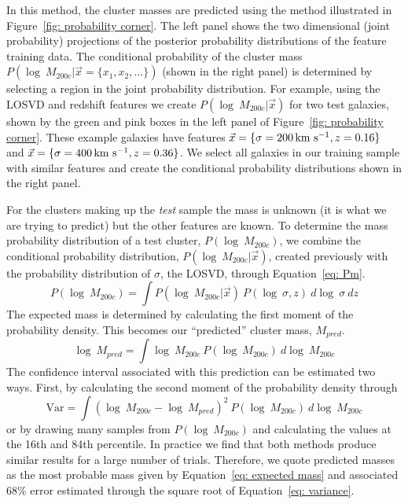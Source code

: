\documentclass[fleqn,usenatbib]{mnras}
\begin{document}
In this method, the cluster masses are predicted using the method illustrated in Figure~\ref{fig: probability corner}. The left panel shows the two dimensional (joint probability) projections of the posterior probability distributions of the feature training data. The conditional probability of the cluster mass $P(\log\ M_{200c}|\vec{x}= \{ x_1,x_2,...\})$ (shown in the right panel) is determined by selecting a region in the joint probability distribution. For example, using the LOSVD and redshift features we create $P(\log\ M_{200c}|\vec{x})$ for two test galaxies, shown by the green and pink boxes in the left panel of Figure~\ref{fig: probability corner}. These example galaxies have features $\vec{x} = \{\sigma=200\, \hbox{km~s$^{-1}$},z=0.16\}$ and $\vec{x} = \{\sigma=400\, \hbox{km~s$^{-1}$},z=0.36\}$. We select all galaxies in our training sample with similar features and create the conditional probability distributions shown in the right panel.

For the clusters making up the \emph{test} sample the mass is unknown (it is what we are trying to predict) but the other features are known. To determine the mass probability distribution of a test cluster, $P(\log\ M_{200c})$, we combine the conditional probability distribution, $P(\log\ M_{200c}|\vec{x})$, created previously with the probability distribution of $\sigma$, the LOSVD, through Equation~\ref{eq: Pm}.
\begin{equation}\label{eq: Pm}
	P(\log\ M_{200c}) = \int P(\log\ M_{200c}|\vec{x})\ P(\log\ \sigma, z)\ d\log\ \sigma\ dz
\end{equation}
The expected mass is determined by calculating the first moment of the probability density. This becomes our ``predicted'' cluster mass, $M_{pred}$.
\begin{equation}\label{eq: expected mass}
	\log\ M_{pred}= \int \log\ M_{200c}\ P(\log\ M_{200c})\ d\log\ M_{200c}
\end{equation}
The confidence interval associated with this prediction can be estimated two ways. First, by calculating the second moment of the probability density through
\begin{equation}\label{eq: variance}
	\mathrm{Var} = \int (\log\ M_{200c} - \log\ M_{pred})^2\ P(\log\ M_{200c})\ d\log\ M_{200c}
\end{equation}
or by drawing many samples from $P(\log\ M_{200c})$ and calculating the values at the 16th and 84th percentile. In practice we find that both methods produce similar results for a large number of trials. Therefore, we quote predicted masses as the most probable mass given by Equation~\ref{eq: expected mass} and associated 68\% error estimated through the square root of Equation~\ref{eq: variance}.
\end{document}
